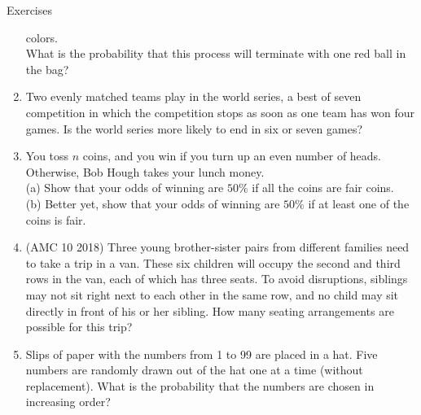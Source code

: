 \begin{xcb}{Exercises}
\begin{enumerate}
colors.\\
What is the probability that this process will terminate with one red ball in the bag?
\begin{hint}
\end{hint}
\item {} Two evenly matched teams play in the world series, a best of seven competition in which the competition stops as soon as one team has won four games. Is the world series more likely to end in six or seven games?
\item You toss $n$ coins, and you win if you turn up an even number of heads. Otherwise, Bob Hough takes your lunch money.\\
(a)  Show that your odds of winning are $50\%$ if all the coins are fair coins.\\
(b)  Better yet, show that your odds of winning are $50\%$ if at least one of the coins is
fair.\\
\item(AMC 10 2018)  Three young brother-sister pairs from different families need to take a trip in a van. These six children will occupy the second and third rows in the van, each of which has three seats. To avoid disruptions, siblings may not sit right next to each other in the same row, and no child may sit directly in front of his or her sibling. How many seating arrangements are possible for this trip?
\item Slips of paper with the numbers from 1 to 99 are placed in a hat. Five numbers are randomly drawn out of the hat one at a time (without replacement). What is the probability that the numbers are chosen in increasing order?
\end{enumerate}
\end{xcb}
